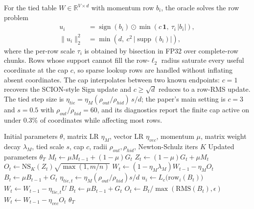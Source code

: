For the tied table $W \in \mathbb{R}^{V \times d}$ with momentum row $b_i$, the oracle solves the row problem
\begin{align}
u_i &= \operatorname{sign}(b_i) \odot \min\left(c\,\mathbf{1},\ \tau_i\,|b_i|\right), \\
\|u_i\|_2^2 &= \min\left(d,\ c^2\,\bigl|\operatorname{supp}(b_i)\bigr|\right),
\end{align}
where the per-row scale $\tau_i$ is obtained by bisection in FP32 over complete-row chunks. Rows whose support cannot fill the row-$\ell_2$ radius saturate every useful coordinate at the cap $c$, so sparse lookup rows are handled without inflating absent coordinates. The cap interpolates between two known endpoints: $c = 1$ recovers the SCION-style Sign update and $c \geq \sqrt{d}$ reduces to a row-RMS update. The tied step size is $\eta_{tie} = \eta_M (\rho_{out}/\rho_{hid})\, s / d$; the paper's main setting is $c = 3$ and $s = 0.5$ with $\rho_{out}/\rho_{hid} = 60$, and its diagnostics report the finite cap active on under 0.3\% of coordinates while affecting most rows.

\begin{algorithm}[H]
\caption{AF-Muon (AdamW-Free Tied-Embedding Muon)}
\label{alg:af-muon}
\begin{algorithmic}[1]
\Require Initial parameters $\theta$, matrix LR $\eta_M$, vector LR $\eta_{vec}$, momentum $\mu$, matrix weight decay $\lambda_M$, tied scale $s$, cap $c$, radii $\rho_{out}, \rho_{hid}$, Newton-Schulz iters $K$
\Ensure Updated parameters $\theta_T$
        \State $M_t \gets \mu M_{t-1} + (1-\mu) G_t$ 
        \State $Z_t \gets (1-\mu) G_t + \mu M_t$ 
        \State $O_t \gets \mathrm{NS}_K(Z_t)\sqrt{\max(1, m/n)}$ 
        \State $W_t \gets (1 - \eta_M \lambda_M) W_{t-1} - \eta_M O_t$
        \State $B_t \gets \mu B_{t-1} + G_t$ 
        \State $\eta_{tie,t} \gets \eta_M (\rho_{out}/\rho_{hid}) s / d$
            \State $u_i \gets L_c\bigl(\mathrm{row}_i(B_t)\bigr)$ 
        \EndFor
        \State $W_t \gets W_{t-1} - \eta_{tie,t} U$
    \Else
        \State $B_t \gets \mu B_{t-1} + G_t$ 
        \State $O_t \gets B_t / \max(\mathrm{RMS}(B_t), \epsilon)$
        \State $W_t \gets W_{t-1} - \eta_{vec} O_t$
    \EndIf
\EndFor
\Return $\theta_T$
\end{algorithmic}
\end{algorithm}

